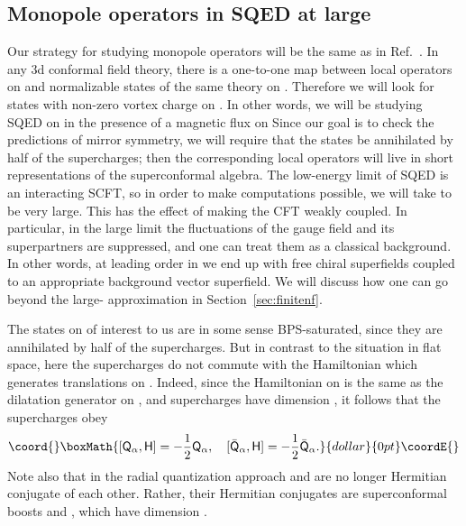 \documentclass[a4paper,12pt, amsfonts, amssymb]{article}
\providecommand{\RR}{{\mathbb R}}
\renewcommand{\SS}{{\mathbb S}}
\providecommand{\Q}{{\mathsf Q}}
\renewcommand{\H}{{\mathsf H}}
\renewcommand{\S}{{\mathsf S}}
\begin{document}
\subsection{Monopole operators in \coordHE{} SQED at large \coordHE{}}

Our strategy for studying monopole operators will be the same as in
Ref.~\cite{BKWone}.
In any 3d conformal field theory, there is a one-to-one map between
local operators on \myHighlight{$\RR^3$}\coordHE{} and normalizable states of the same theory on
\myHighlight{$\SS^2\times\RR$}\coordHE{}. Therefore we will look for states with non-zero vortex
charge on \myHighlight{$\SS^2\times\RR$}\coordHE{}. In other words, we will be studying
\coordHE{} SQED on \myHighlight{$\SS^2\times\RR$}\coordHE{} in the presence of a
magnetic flux on \myHighlight{$\SS^2.$}\coordHE{} 
Since our goal is to check the predictions of
mirror symmetry, we will require that the states be annihilated by half of
the supercharges; then the corresponding local operators will live in
short representations of the superconformal algebra. The low-energy
limit of \coordHE{} SQED is an interacting SCFT, so in order to make computations
possible, we will take \coordHE{} to be very large. This has the effect of making
the CFT weakly coupled. In particular, in the large \coordHE{} limit the fluctuations
of the gauge field and its superpartners are suppressed, and one can treat
them as a classical background. In other words, at leading order in \coordHE{}
we end up with free chiral superfields coupled to an appropriate background
vector superfield. We will discuss how one can go beyond the large-\coordHE{}
approximation in Section~\ref{sec:finitenf}.

The states on \myHighlight{$\SS^2\times\RR$}\coordHE{} of interest to us
are in some sense BPS-saturated, since they are annihilated by half of 
the supercharges. But in contrast to the situation in flat space, here the
supercharges do not commute with the Hamiltonian \myHighlight{$\H$}\coordHE{} which generates
translations on \myHighlight{$\RR$}\coordHE{}. Indeed, since the Hamiltonian on \myHighlight{$\SS^2\times\RR$}\coordHE{} is the same as the dilatation generator on \myHighlight{$\RR^3$}\coordHE{}, and supercharges have 
dimension \coordHE{}, it follows that the supercharges obey
$$\coord{}\boxMath{
[\Q_\alpha,\H]=-\frac{1}{2} \Q_\alpha, \quad [{\bar\Q}_\alpha,\H]=-\frac{1}{2}{\bar\Q}_\alpha.
}{dollar}{0pt}\coordE{}$$ 
Note also that in the radial quantization approach \myHighlight{$\Q_\alpha$}\coordHE{} and
\myHighlight{${\bar\Q}_\alpha$}\coordHE{}
are no longer Hermitian conjugate of each other. Rather, their Hermitian
conjugates are superconformal boosts \myHighlight{$\S_\alpha$}\coordHE{} and \myHighlight{${\bar\S}_\alpha$}\coordHE{}, which
have dimension \coordHE{}.
\end{document}
